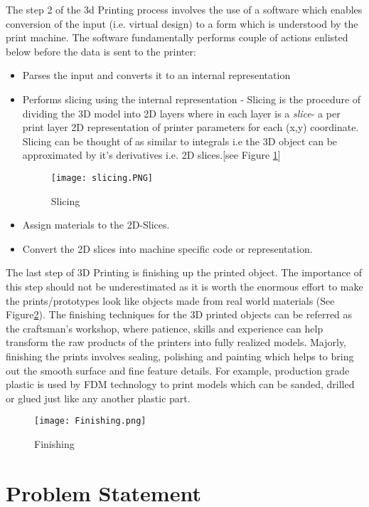 The step 2 of the 3d Printing process involves the use of a software which enables conversion of the input (i.e. virtual design) to a form which is understood by the print machine. The software fundamentally performs couple of actions enlisted below before the data is sent to the printer:
\begin{itemize}
\item Parses the input and converts it to an internal representation
\item Performs slicing using the internal representation - Slicing is the procedure of dividing the 3D model into 2D layers where in each layer is a \textsl{slice}- a per print layer 2D representation of printer parameters for each (x,y) coordinate. Slicing can be thought of as similar to integrals i.e the 3D object can be approximated by it's derivatives i.e. 2D slices.[see Figure \ref{fig:slicing}]
\begin{figure}[ht!]
\centering
\texttt{[image: slicing.PNG]}
\caption{Slicing}
\label{fig:slicing}
\end{figure}

\item Assign materials to the 2D-Slices. 
\item Convert the 2D slices into machine specific code or representation.
\end{itemize}

The last step of 3D Printing is finishing up the printed object. The importance of this step should not be underestimated as it is worth the enormous effort to make the prints/prototypes look like objects made from real world materials (See Figure\ref{fig:Finishing}). The finishing techniques for the 3D printed objects can be referred as the craftsman's workshop, where patience, skills and experience can help transform the raw products of the printers into fully realized models. Majorly, finishing the prints involves sealing, polishing and painting which helps to bring out the smooth surface and fine feature details. For example, production grade plastic is used by FDM technology to print models which can be sanded, drilled or glued just like any another plastic part. 

\begin{figure}[ht!]
\centering
\texttt{[image: Finishing.png]}
\caption{Finishing}
\label{fig:Finishing}
\end{figure}


\section{Problem Statement}

